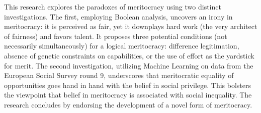 This research explores the paradoxes of meritocracy using two distinct investigations. The first, employing Boolean analysis, uncovers an irony in meritocracy: it is perceived as fair, yet it downplays hard work (the very architect of fairness) and favors talent. It proposes three potential conditions (not necessarily simultaneously) for a logical meritocracy: difference legitimation, absence of genetic constraints on capabilities, or the use of effort as the yardstick for merit. The second investigation, utilizing Machine Learning on data from the European Social Survey round 9, underscores that meritocratic equality of opportunities goes hand in hand with the belief in social privilege. This bolsters the viewpoint that belief in meritocracy is associated with social inequality. The research concludes by endorsing the development of a novel form of meritocracy.